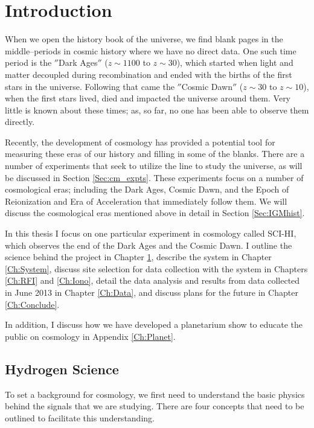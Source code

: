 \chapter{Introduction}\label{Ch:Intro}
When we open the history book of the universe, we find blank pages in the middle--periods in cosmic history where we have no direct data. One such time period is the $''$Dark Ages$''$ ($z \sim 1100$ to $z \sim 30$), which started when light and matter decoupled during recombination and ended with the births of the first stars in the universe. Following that came the $''$Cosmic Dawn$''$ ($z\sim 30$ to $z\sim 10$), when the first stars lived, died and impacted the universe around them. Very little is known about these times; as, so far, no one has been able to observe them directly. 

Recently, the development of \cm cosmology has provided a potential tool for measuring these eras of our history and filling in some of the blanks. There are a number of experiments that seek to utilize the \cm line to study the universe, as will be discussed in Section \ref{Sec:cm_expts}. These experiments focus on a number of cosmological eras; including the Dark Ages, Cosmic Dawn, and the Epoch of Reionization and Era of Acceleration that immediately follow them. We will discuss the cosmological eras mentioned above in detail in Section \ref{Sec:IGMhist}.   

In this thesis I focus on one particular experiment in \cm cosmology called SCI-HI, which observes the end of the Dark Ages and the Cosmic Dawn. I outline the science behind the project in Chapter \ref{Ch:Intro}, describe the system in Chapter \ref{Ch:System}, discuss site selection for data collection with the system in Chapters \ref{Ch:RFI} and \ref{Ch:Iono}, detail the data analysis and results from data collected in June 2013 in Chapter \ref{Ch:Data}, and discuss plans for the future in Chapter \ref{Ch:Conclude}. 

In addition, I discuss how we have developed a planetarium show to educate the public on \cm cosmology in Appendix \ref{Ch:Planet}. 

\section{Hydrogen \cm Science}
To set a background for \cm cosmology, we first need to understand the basic physics behind the signals that we are studying. There are four concepts that need to be outlined to facilitate this understanding. 

